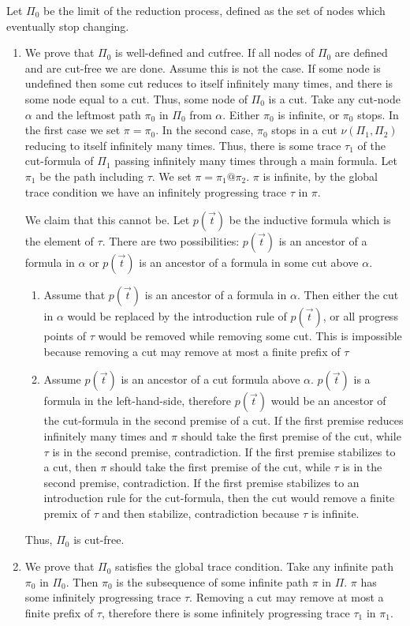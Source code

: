 \documentclass[a4paper,12pt]{article}
\newenvironment{proof}[1][Proof]{\begin{trivlist}
\item[\hskip \labelsep {\bfseries #1}]}{\end{trivlist}}
\begin{document}
\begin{proof}
Let $\Pi_0$ be the limit of the reduction process, defined as the set of nodes which eventually stop changing. 
\begin{enumerate}
\item
We prove that $\Pi_0$ is well-defined and cutfree. If all nodes of $\Pi_0$ are defined and are cut-free we are done. Assume this is not the case. If some node is undefined then some cut reduces to itself infinitely many times, and there is some node equal to a cut. Thus, some node of $\Pi_0$ is a cut. Take any cut-node $\alpha$ and the leftmost path $\pi_0$ in $\Pi_0$ from $\alpha$. Either $\pi_0$ is infinite, or $\pi_0$ stops. In the first case we set $\pi=\pi_0$. In the second case, $\pi_0$ stops in a cut $\nu(\Pi_1, \Pi_2)$ reducing to itself infinitely many times. Thus, there is some trace $\tau_1$ of the cut-formula of $\Pi_1$ passing infinitely many times through a main formula. Let $\pi_1$ be the path including $\tau$. We set $\pi = \pi_1@\pi_2$. $\pi$ is infinite, by the global trace condition we have an infinitely progressing trace $\tau$ in $\pi$. 

We claim that this cannot be. Let $p(\vec{t})$ be the inductive formula which is the element of $\tau$. There are two possibilities: $p(\vec{t})$ is an ancestor of a formula in $\alpha$ or $p(\vec{t})$ is an ancestor of a formula in some cut above $\alpha$.
\begin{enumerate}
\item
Assume that $p(\vec{t})$ is an ancestor of a formula in $\alpha$. Then either the cut in $\alpha$ would be replaced by the introduction rule of $p(\vec{t})$, or all progress points of $\tau$ would be removed while removing some cut. This is impossible because removing a cut may remove at most a finite prefix of $\tau$
\item
Assume $p(\vec{t})$ is an ancestor of a cut formula above $\alpha$. $p(\vec{t})$ is a formula in the left-hand-side, therefore $p(\vec{t})$ would be an ancestor of the cut-formula in the second premise of a cut. If the first premise reduces infinitely many times and $\pi$ should take the first premise of the cut, while $\tau$ is in the second premise, contradiction. If the first premise stabilizes to a cut, then $\pi$ should take the first premise of the cut, while $\tau$ is in the second premise, contradiction. If the first premise stabilizes to an introduction rule for the cut-formula, then the cut would remove a finite premix of $\tau$ and then stabilize, contradiction because $\tau$ is infinite. 
\end{enumerate}
Thus, $\Pi_0$ is cut-free. 
\item
We prove that $\Pi_0$ satisfies the global trace condition. Take any infinite path $\pi_0$ in $\Pi_0$. Then $\pi_0$ is the subsequence of some infinite path $\pi$ in $\Pi$. $\pi$ has some infinitely progressing trace $\tau$. Removing a cut may remove at most a finite prefix of $\tau$, therefore there is some infinitely progressing trace $\tau_1$ in $\pi_1$.
\end{enumerate}
\end{proof}
\end{document}
